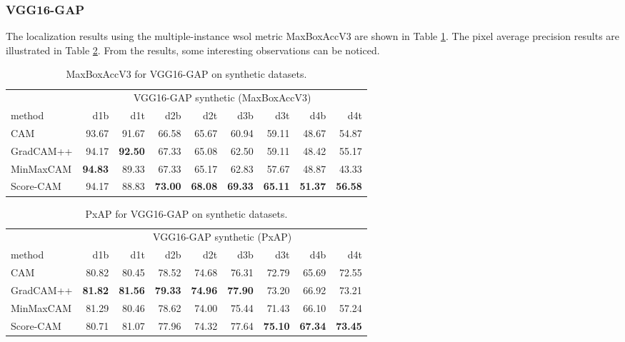 \subsubsection{VGG16-GAP}
The localization results using the multiple-instance \acrshort{wsol} metric MaxBoxAccV3 are shown in Table \ref{tab:maxboxaccv3_vgg16_gap_synthetic}. The pixel average precision results are illustrated in Table \ref{tab:pxap_vgg16_gap_synthetic}. From the results, some interesting observations can be noticed.
\begin{table}[ht]
\centering
\begin{tabular}{lrrrrrrrr}
\toprule
 & \multicolumn{8}{c}{VGG16-GAP synthetic (MaxBoxAccV3)} \\
method & d1b & d1t & d2b & d2t & d3b & d3t & d4b & d4t \\
\cmidrule(lr){1-1} \cmidrule(lr){2-9} 
CAM & 93.67 & 91.67 & 66.58 & 65.67 & 60.94 & 59.11 & 48.67 & 54.87 \\
GradCAM++ & 94.17 & \bfseries 92.50 & 67.33 & 65.08 & 62.50 & 59.11 & 48.42 & 55.17 \\
MinMaxCAM & \bfseries 94.83 & 89.33 & 67.33 & 65.17 & 62.83 & 57.67 & 48.87 & 43.33 \\
Score-CAM & 94.17 & 88.83 & \bfseries 73.00 & \bfseries 68.08 & \bfseries 69.33 & \bfseries 65.11 & \bfseries 51.37 & \bfseries 56.58 \\
\bottomrule
\end{tabular}
\caption[MaxBoxAccV3 for VGG16-GAP on synthetic datasets]{MaxBoxAccV3 for VGG16-GAP on synthetic datasets.}
\label{tab:maxboxaccv3_vgg16_gap_synthetic}
\end{table}
\begin{table}[h]
\centering
\begin{tabular}{lrrrrrrrr}
\toprule
 & \multicolumn{8}{c}{VGG16-GAP synthetic (PxAP)} \\
method & d1b & d1t & d2b & d2t & d3b & d3t & d4b & d4t \\
\cmidrule(lr){1-1} \cmidrule(lr){2-9} 
CAM & 80.82 & 80.45 & 78.52 & 74.68 & 76.31 & 72.79 & 65.69 & 72.55 \\
GradCAM++ & \bfseries 81.82 & \bfseries 81.56 & \bfseries 79.33 & \bfseries 74.96 & \bfseries 77.90 & 73.20 & 66.92 & 73.21 \\
MinMaxCAM & 81.29 & 80.46 & 78.62 & 74.00 & 75.44 & 71.43 & 66.10 & 57.24 \\
Score-CAM & 80.71 & 81.07 & 77.96 & 74.32 & 77.64 & \bfseries 75.10 & \bfseries 67.34 & \bfseries 73.45 \\
\bottomrule
\end{tabular}
\caption[PxAP for VGG16-GAP on synthetic datasets]{PxAP for VGG16-GAP on synthetic datasets.}
\label{tab:pxap_vgg16_gap_synthetic}
\end{table}

